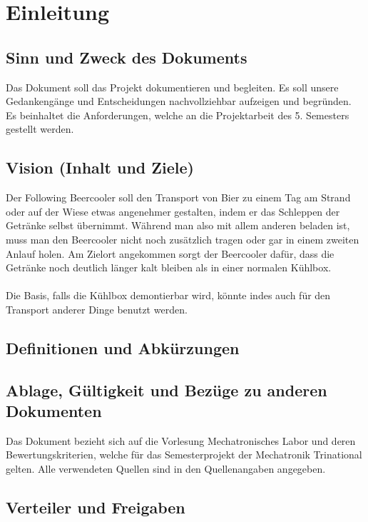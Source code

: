 \section{Einleitung}

\subsection{Sinn und Zweck des Dokuments}
Das Dokument soll das Projekt dokumentieren und begleiten. Es soll unsere Gedankengänge und Entscheidungen nachvollziehbar aufzeigen und begründen. Es beinhaltet die Anforderungen, welche an die Projektarbeit des 5. Semesters gestellt werden.

\subsection{Vision (Inhalt und Ziele)}
Der Following Beercooler soll den Transport von Bier zu einem Tag am Strand oder auf der Wiese etwas angenehmer gestalten, indem er das Schleppen der Getränke selbst übernimmt. Während man also mit allem anderen beladen ist, muss man den Beercooler nicht noch zusätzlich tragen oder gar in einem zweiten Anlauf holen. Am Zielort angekommen sorgt der Beercooler dafür, dass die Getränke noch deutlich länger kalt bleiben als in einer normalen Kühlbox. \\
\\
Die Basis, falls die Kühlbox demontierbar wird, könnte indes auch für den Transport anderer Dinge benutzt werden.

\subsection{Definitionen und Abkürzungen}

\subsection{Ablage, Gültigkeit und Bezüge zu anderen Dokumenten}
Das Dokument bezieht sich auf die Vorlesung Mechatronisches Labor und deren Bewertungskriterien, welche für das Semesterprojekt der Mechatronik Trinational gelten. Alle verwendeten Quellen sind in den Quellenangaben angegeben.

\subsection{Verteiler und Freigaben}

